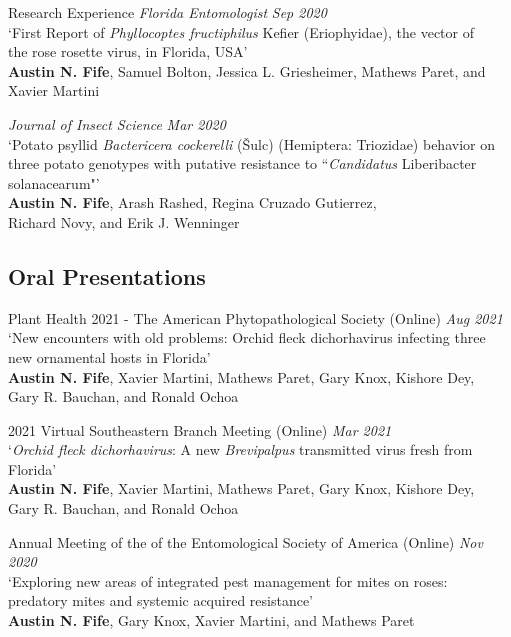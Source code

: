 \documentclass{resume} %
\begin{document}
\begin{rSection}{Research Experience}
\textit{Florida Entomologist} \hfill {\em \textit{Sep 2020}}\\
`First Report of \textit{Phyllocoptes fructiphilus} Kefier (Eriophyidae), the vector of\\
the rose rosette virus, in Florida, USA'\\
\textbf{Austin N. Fife}, Samuel Bolton, Jessica L. Griesheimer, Mathews Paret, and Xavier Martini\\ \hfill

\textit{Journal of Insect Science} \hfill {\em \textit{Mar 2020}}\\
`Potato psyllid \textit{Bactericera cockerelli} (Šulc) (Hemiptera: Triozidae) behavior on\\
 three potato genotypes with putative resistance to ``\textit{Candidatus} Liberibacter solanacearum"'\\
\textbf{Austin N. Fife}, Arash Rashed, Regina Cruzado Gutierrez,\\ Richard Novy, and Erik J. Wenninger\\


\subsection*{Oral Presentations}
Plant Health 2021 - The American Phytopathological Society (Online) \hfill {\em \textit{Aug 2021}}\\
`New encounters with old problems: Orchid fleck dichorhavirus infecting three new ornamental hosts in Florida'\\
\textbf{Austin N. Fife}, Xavier Martini, Mathews Paret, Gary Knox, Kishore Dey,\\
Gary R. Bauchan, and Ronald Ochoa\\ \hfill

2021 Virtual Southeastern Branch Meeting (Online) \hfill {\em \textit{Mar 2021}}\\
`\textit{Orchid fleck dichorhavirus}: A new \textit{Brevipalpus} transmitted virus fresh from Florida'\\
\textbf{Austin N. Fife}, Xavier Martini, Mathews Paret, Gary Knox, Kishore Dey,\\
Gary R. Bauchan, and Ronald Ochoa\\ \hfill

Annual Meeting of the of the Entomological Society of America (Online) \hfill {\em \textit{Nov 2020}}\\
`Exploring new areas of integrated pest management for mites on roses:\\
predatory mites and systemic acquired resistance'\\
\textbf{Austin N. Fife}, Gary Knox, Xavier Martini, and Mathews Paret\\ \hfill


\end{rSection}
\end{document}
